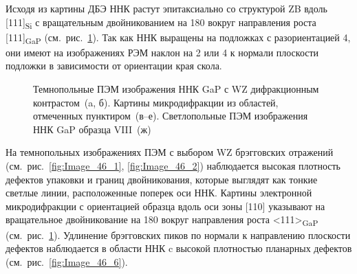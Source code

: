 Исходя из картины ДБЭ ННК растут эпитаксиально со структурой ZB вдоль
[111]\textsubscript{Si} с вращательным двойникованием на 180{\textdegree}
вокруг направления роста [111]\textsubscript{GaP}
(см.~рис.~\cref{fig:Image_46}). Так как ННК выращены на подложках с
разориентацией 4{\textdegree}, они имеют на изображениях РЭМ наклон на
2{\textdegree} или 4{\textdegree} к нормали плоскости подложки в зависимости от
ориентации края скола.

\begin{figure}[ht]  
\caption{Темнопольные ПЭМ изображения ННК GaP с WZ дифракционным контрастом~(a,
б). Картины микродифракции из областей, отмеченных пунктиром~(в--е).
Светлопольные ПЭМ изображения ННК GaP образца VIII~(ж)}\label{fig:Image_46}
\end{figure}

На темнопольных изображениях ПЭМ с выбором WZ брэгговских отражений
(см.~рис.~\cref{fig:Image_46_1}, \cref{fig:Image_46_2}) наблюдается высокая
плотность дефектов упаковки и границ двойникования, которые выглядят как тонкие
светлые линии, расположенные поперек оси ННК. Картины электронной
микродифракции с ориентацией образца вдоль оси зоны [110] указывают на
вращательное двойникование на 180{\textdegree} вокруг направления роста
<111>\textsubscript{GaP} (см.~рис.~\cref{fig:Image_46}). Удлинение брэгговских
пиков по нормали к направлению плоскости дефектов наблюдается в области ННК c
высокой плотностью планарных дефектов (см.~рис.~\cref{fig:Image_46_6}).

